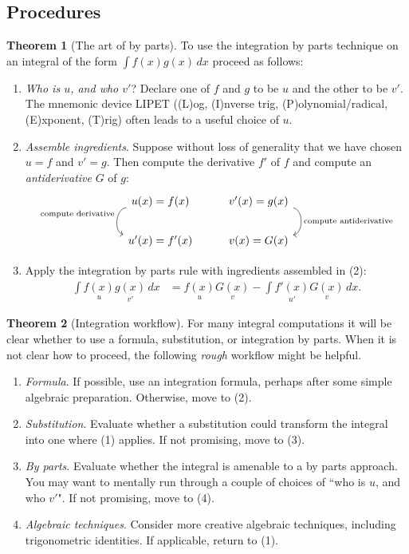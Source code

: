 \documentclass[11pt]{article}
\theoremstyle{definition}
\theoremstyle{named}
\newtheorem*{namedtheorem}{Theorem}
\numberwithin{myalgctr}{section}
\begin{document}
\subsection*{Procedures}
\begin{namedtheorem}[The art of by parts]
To use the integration by parts technique on an integral of the form $\displaystyle\int f(x)g(x)\, dx$ proceed as follows:
\begin{enumerate}
  \item {\em Who is $u$, and who $v'$}? Declare one of $f$ and $g$ to be $u$ and the other to be $v'$. The mnemonic device LIPET ((L)og, (I)nverse trig, (P)olynomial/radical, (E)xponent, (T)rig) often leads to a useful choice of $u$.
  \item {\em Assemble ingredients}. Suppose without loss of generality that we have chosen $u=f$ and $v'=g$. Then compute the derivative $f'$ of $f$ and compute an {\em antiderivative} $G$ of $g$:
  \[
  \begin{tikzcd}
    u(x)=f(x) \ar[d,bend right=80,"\text{compute derivative}"'] & v'(x)=g(x) \ar[d,bend left=80,"\text{compute antiderivative}"]\\
    u'(x)=f'(x) & v(x)=G(x)
  \end{tikzcd}
  \]
  \item Apply the integration by parts rule with ingredients assembled in (2):
  \begin{align*}
    \int \underset{u}{f(x)}\underset{v'}{g(x)}\, dx&= \underset{u}{f(x)}\underset{v}{G(x)}-\int \underset{u'}{f'(x)}\underset{v}{G(x)}\, dx.
  \end{align*}
  \end{enumerate}

\end{namedtheorem}
\begin{namedtheorem}[Integration workflow]
For many integral computations it will be clear whether to use a formula, substitution, or integration by parts. When it is not clear how to proceed, the following {\em rough} workflow might be helpful.
\begin{enumerate}[itemsep=0pt, topsep=0pt]
  \item {\em Formula}. If possible, use an integration formula, perhaps after some simple algebraic preparation. Otherwise, move to (2).
  \item {\em Substitution}. Evaluate whether a substitution could transform the integral into one where (1) applies. If not promising, move to (3).
  \item {\em By parts}. Evaluate whether the integral is amenable to a by parts approach. You may want to mentally run through a couple of choices of ``who is $u$, and who $v'$". If not promising, move to (4).
  \item {\em Algebraic techniques}. Consider more creative algebraic techniques, including trigonometric identities. If applicable, return to (1).
\end{enumerate}

\end{namedtheorem}
\end{document}
